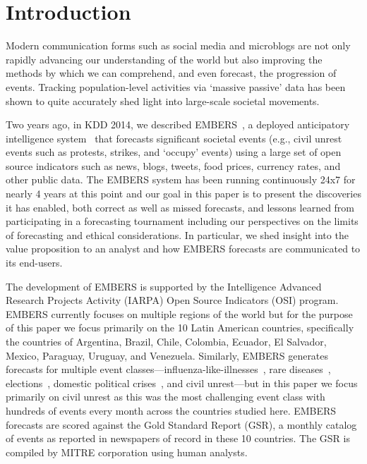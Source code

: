 \section{Introduction}
Modern communication forms such as social media and microblogs are not only rapidly
advancing our understanding of the world but also improving the methods by which we can
comprehend, and even forecast, the progression of events.
Tracking population-level activities via `massive passive' data has been shown to
quite accurately shed light into large-scale societal movements.

Two years ago, in KDD 2014, we described EMBERS~\cite{kdd:beating-the-news}, a deployed anticipatory
intelligence system~\cite{bigdata-andy-doyle-embers-paper} that forecasts significant
societal events (e.g., civil unrest
events such as protests, strikes, and `occupy' events) using a large set of open source
indicators such as news, blogs, tweets, food prices, currency rates, and other public
data. The EMBERS system has been running continuously 24x7 for nearly 4 years at this point
and our goal in this paper is to present the discoveries it has enabled,
both correct as well as missed
forecasts, and lessons learned from participating in a forecasting tournament including
our perspectives on the limits of forecasting and ethical considerations. In
particular, we shed insight into the value proposition to an analyst and how EMBERS forecasts
are communicated to its end-users.

The development of EMBERS is supported by the Intelligence Advanced Research Projects
Activity (IARPA) Open Source Indicators (OSI) program.
EMBERS currently focuses on multiple regions of the world but for the purpose of this paper
we focus primarily on the 10 Latin American countries, specifically the countries of
Argentina, Brazil, Chile, Colombia, Ecuador, El Salvador, Mexico, Paraguay, Uruguay, and Venezuela.
Similarly, EMBERS generates forecasts for multiple event
classes---influenza-like-illnesses~\cite{prithwish-ili}, rare
diseases~\cite{sdm-saurav}, elections~\cite{aravindan-wei-besc},
domestic political crises~\cite{gdelt-acm-webscience}, and civil
unrest---but in this paper we focus primarily on civil unrest as this
was the most challenging event class with hundreds of events every month across the countries studied here.
EMBERS forecasts are scored against the Gold Standard Report (GSR), a monthly catalog of
events as reported in newspapers of record in these 10 countries. 
The GSR is compiled by MITRE corporation
using human analysts.


